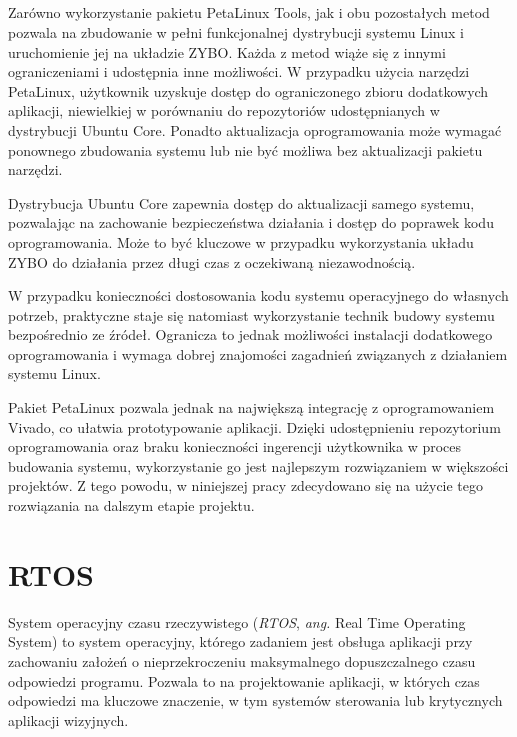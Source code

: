 \subsection*{} %

Zarówno wykorzystanie pakietu PetaLinux Tools, jak i obu pozostałych metod pozwala na zbudowanie w pełni funkcjonalnej dystrybucji systemu Linux i uruchomienie jej na układzie ZYBO. %
Każda z metod wiąże się z innymi ograniczeniami i udostępnia inne możliwości. 
W przypadku użycia narzędzi PetaLinux, użytkownik uzyskuje dostęp do ograniczonego zbioru dodatkowych aplikacji, niewielkiej w porównaniu do repozytoriów udostępnianych w dystrybucji Ubuntu Core. 
Ponadto aktualizacja oprogramowania może wymagać ponownego zbudowania systemu lub nie być możliwa bez aktualizacji pakietu narzędzi. 

Dystrybucja Ubuntu Core zapewnia dostęp do aktualizacji samego systemu, pozwalając na zachowanie bezpieczeństwa działania i dostęp do poprawek kodu oprogramowania. 
Może to być kluczowe w przypadku wykorzystania układu ZYBO do działania przez długi czas z oczekiwaną niezawodnością. %

W przypadku konieczności dostosowania kodu systemu operacyjnego do własnych potrzeb, praktyczne staje się natomiast wykorzystanie technik budowy systemu bezpośrednio ze źródeł. 
Ogranicza to jednak możliwości instalacji dodatkowego oprogramowania i wymaga dobrej znajomości zagadnień związanych z działaniem systemu Linux.

Pakiet PetaLinux pozwala jednak na największą integrację z oprogramowaniem Vivado, co ułatwia prototypowanie aplikacji. 
Dzięki udostępnieniu repozytorium oprogramowania oraz braku konieczności ingerencji użytkownika w proces budowania systemu, wykorzystanie go jest najlepszym rozwiązaniem w większości projektów. 
Z tego powodu, w niniejszej pracy zdecydowano się na użycie tego rozwiązania na dalszym etapie projektu.

\section{RTOS}

System operacyjny czasu rzeczywistego (\emph{RTOS}, \emph{ang.} Real Time Operating System) to system operacyjny, którego zadaniem jest obsługa aplikacji przy zachowaniu założeń o nieprzekroczeniu maksymalnego dopuszczalnego czasu odpowiedzi programu. 
Pozwala to na projektowanie aplikacji, w których czas odpowiedzi ma kluczowe znaczenie, w tym systemów sterowania lub krytycznych aplikacji wizyjnych.

